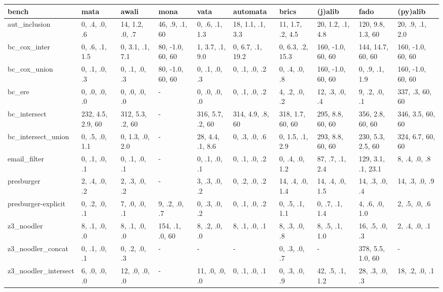 \begin{tabular}{llllllllll}
\hline
 bench                & mata              & awali            & mona             & vata             & automata         & brics            & (j)alib           & fado               & (py)alib          \\
\hline
 aut_inclusion        & 0, .4, .0, .6     & 14, 1.2, .0, .7  & 46, .9, .1, 60   & 0, .6, .1, 1.3   & 18, 1.1, .1, 3.3 & 11, 1.7, .2, 4.5 & 20, 1.2, .1, 4.8  & 120, 9.8, 1.3, 60  & 20, .9, .1, 2.0   \\
 bc_cox_inter         & 0, .6, .1, 1.5    & 0, 3.1, .1, 7.1  & 80, -1.0, 60, 60 & 1, 3.7, .1, 9.0  & 0, 6.7, .1, 19.2 & 0, 6.3, .2, 15.3 & 160, -1.0, 60, 60 & 144, 14.7, 60, 60  & 160, -1.0, 60, 60 \\
 bc_cox_union         & 0, .1, .0, .3     & 0, .1, .0, .3    & 80, -1.0, 60, 60 & 0, .1, .0, .3    & 0, .1, .0, .2    & 0, .4, .0, .8    & 160, -1.0, 60, 60 & 0, .9, .1, 1.9     & 160, -1.0, 60, 60 \\
 bc_ere               & 0, .0, .0, .0     & 0, .0, .0, .0    & -                & 0, .0, .0, .0    & 0, .1, .0, .2    & 4, .2, .0, .2    & 12, .3, .0, .4    & 9, .2, .0, .1      & 337, .3, 60, 60   \\
 bc_intersect         & 232, 4.5, 2.9, 60 & 312, 5.3, .2, 60 & -                & 316, 5.7, .2, 60 & 314, 4.9, .8, 60 & 318, 1.7, 60, 60 & 295, 8.8, 60, 60  & 356, 2.8, 60, 60   & 346, 3.5, 60, 60  \\
 bc_intersect_union   & 0, .5, .0, 1.1    & 0, 1.3, .0, 2.0  & -                & 28, 4.4, .1, 8.6 & 0, .3, .0, .6    & 0, 1.5, .1, 2.9  & 293, 8.8, 60, 60  & 230, 5.3, 2.5, 60  & 324, 6.7, 60, 60  \\
 email_filter         & 0, .1, .0, .1     & 0, .1, .0, .1    & -                & 0, .1, .0, .1    & 0, .1, .0, .2    & 0, .4, .0, 1.2   & 87, .7, .1, 2.4   & 129, 3.1, .1, 23.1 & 8, .4, .0, .8     \\
 presburger           & 2, .4, .0, .2     & 2, .3, .0, .2    & -                & 3, .3, .0, .2    & 0, .2, .0, .2    & 14, .4, .0, 1.4  & 14, .4, .0, 1.5   & 14, .3, .0, .4     & 14, .3, .0, .9    \\
 presburger-explicit  & 0, .2, .0, .1     & 7, .0, .0, .1    & 9, .2, .0, .7    & 0, .3, .0, .2    & 0, .1, .0, .2    & 0, .5, .1, 1.1   & 0, .7, .1, 1.4    & 4, .6, .0, 1.0     & 2, .5, .0, .6     \\
 z3_noodler           & 8, .1, .0, .0     & 8, .1, .0, .0    & 154, .1, .0, 60  & 8, .2, .0, .0    & 8, .1, .0, .1    & 8, .3, .0, .8    & 8, .5, .1, 1.0    & 16, .5, .0, .3     & 2, .4, .0, .1     \\
 z3_noodler_concat    & 0, .1, .0, .1     & 0, .2, .0, .3    & -                & -                & -                & 0, .3, .0, .7    & -                 & 378, 5.5, 1.0, 60  & -                 \\
 z3_noodler_intersect & 6, .0, .0, .0     & 12, .0, .0, .0   & -                & 11, .0, .0, .0   & 0, .1, .0, .1    & 0, .3, .0, .9    & 42, .5, .1, 1.2   & 28, .3, .0, .3     & 18, .2, .0, .1    \\
\hline
\end{tabular}